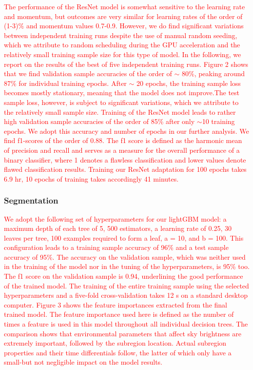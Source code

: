 \documentclass[amt, article]{copernicus}
\begin{document}
\textcolor{red}{The performance of the ResNet model is somewhat sensitive to the learning rate and momentum, but outcomes are very similar for learning rates of the order of (1-3)\% and momentum
values 0.7-0.9. However, we do find significant variations
between independent training runs despite the use of manual
random seeding, which we attribute to random scheduling
during the GPU acceleration and the relatively small training
sample size for this type of model. In the following, we report
on the results of the best of five independent training runs.
Figure 2 shows that we find validation sample accuracies of
the order of $\sim$ 80\%, peaking around 87\% for individual training epochs. After $\sim$ 20 epochs, the training sample loss becomes mostly stationary, meaning that the model does not improve.The test sample loss, however, is subject to significant
variations, which we attribute to the relatively small sample
size. Training of the ResNet model leads to rather high
validation sample accuracies of the order of 85\% after only
$\sim$10 training epochs. We adopt this accuracy and number of
epochs in our further analysis. We find f1-scores of the order of 0.88. The f1 score is defined as the harmonic mean of precision and recall and serves as a measure for the overall performance of a binary classifier, where 1 denotes a flawless classification and lower values denote flawed classification results. Training our ResNet adaptation for 100 epochs takes 6.9 hr, 10 epochs of training takes accordingly 41 minutes.}
\subsubsection{Segmentation}

\textcolor{red}{We adopt the following set of hyperparameters for our lightGBM model: a maximum depth of each tree of 5, 500 estimators, a learning rate of 0.25, 30 leaves per tree, 100 examples required to form a leaf, a = 10, and b = 100. This configuration leads to a training sample accuracy of 96\% and a
test sample accuracy of 95\%. The accuracy on the validation
sample, which was neither used in the training of the model nor
in the tuning of the hyperparameters, is 95\% too. The f1 score
on the validation sample is 0.94, underlining the good
performance of the trained model.
The training of the entire training sample using the selected
hyperparameters and a five-fold cross-validation takes 12 s on
a standard desktop computer. Figure 3 shows the feature importances extracted from the
final trained model. The feature importance used here is defined
as the number of times a feature is used in this model
throughout all individual decision trees. The comparison shows
that environmental parameters that affect sky brightness are
extremely important, followed by the subregion location.
Actual subregion properties and their time differentials follow,
the latter of which only have a small-but not negligible impact on the model results.}
\end{document}
